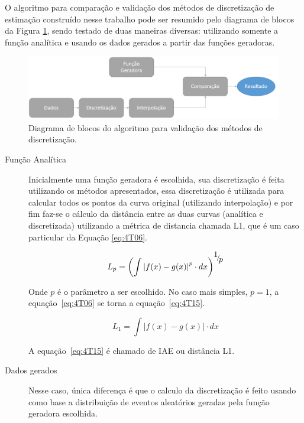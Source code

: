 O algoritmo para comparação e validação dos métodos de discretização de estimação construído nesse trabalho pode ser resumido pelo diagrama de blocos da Figura \ref{fig:08}, sendo testado de duas maneiras diversas: utilizando somente a função analítica e usando os dados gerados a partir das funções geradoras.

\begin{figure}[H]
	\begin{center}
     	\includegraphics[width=0.6\linewidth]{./figuras/algoritmo1}
		\caption{Diagrama de blocos do algoritmo para validação dos métodos de discretização.}\label{fig:08}
	\end{center}
\end{figure}


\begin{description}
	\item[Função Analítica] Inicialmente uma função geradora é escolhida, sua discretização é feita utilizando os métodos apresentados, essa discretização é utilizada para calcular todos os pontos da curva original (utilizando interpolação) e por fim faz-se o cálculo da distância entre as duas curvas (analítica e discretizada) utilizando a métrica de distancia chamada L1, que é um caso particular da Equação \eqref{eq:4T06}.
	
	\begin{equation}\label{eq:4T06}
	{L_p} = {\left( {\int {{{\left| {f(x) - g(x)} \right|}^p}}\cdot dx } \right)^{{\raise0.7ex\hbox{$1$} \!\mathord{\left/
					{\vphantom {1 p}}\right.\kern-\nulldelimiterspace}
				\!\lower0.7ex\hbox{$p$}}}}
	\end{equation}
	
	Onde $p$ é o parâmetro a ser escolhido. No caso mais simples, $p=1$, a equação~\eqref{eq:4T06} se torna a equação~\eqref{eq:4T15}.
	
	\begin{equation}\label{eq:4T15}
	{L_1} = {\int {\left| {f(x) - g(x)} \right|} \cdot dx}
	\end{equation}
	
	A equação~\eqref{eq:4T15} é chamado de \ac{IAE} ou distância L1.
	
	\item[Dados gerados] Nesse caso, única diferença é que o calculo da discretização é feito usando como base a distribuição de eventos aleatórios geradas pela função geradora escolhida.
\end{description}

